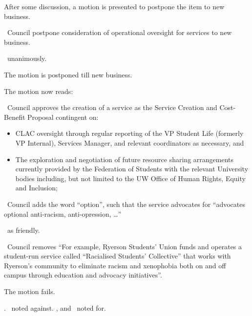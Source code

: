 \begin{motion}
\begin{motion}
        After some discussion, a motion is presented to postpone the item to
        new business.

        \begin{motion}
            \birt\ Council postpone consideration of operational oversight for
            services to new business. 
            \movers{\seneca}{\katie}

            \carries\ unanimously.
        \end{motion}

        The motion is postponed till new business.
    \end{motion}

    The motion now reads:

    \begin{motion}
        \birt\ Council approves the creation of a service as the Service
        Creation and Cost-Benefit Proposal contingent on:

        \begin{itemize}
            \item CLAC oversight through regular reporting of the VP Student
                Life (formerly VP Internal), Services Manager, and relevant
                coordinators as necessary, and 

            \item The exploration and negotiation of future resource sharing
                arrangements currently provided by the Federation of Students
                with the relevant University bodies including, but not limited
                to the UW Office of Human Rights, Equity and Inclusion;
        \end{itemize}
    \end{motion}

    \begin{motion}
        \birt\ Council adds the word ``option'', such that the service 
        advocates for ``advocates optional anti-racism, anti-opression, 
        \ldots'' 
        \movers{\alexander}{\seneca}

        \carries\ as friendly.
    \end{motion}

    \begin{motion}
        \birt\ Council removes ``For example, Ryerson Students' Union funds and
        operates a student-run service called ``Racialised Students'
        Collective'' that works with Ryerson's community to eliminate racism
        and xenophobia both on and off campus through education and advocacy
        initiatives''.
        \movers{\alexander}{\seneca}

        The motion fails.
    \end{motion}

    \carries. \harsh\ noted against. \nickta, and \alexander\ noted for.

\end{motion}
    

